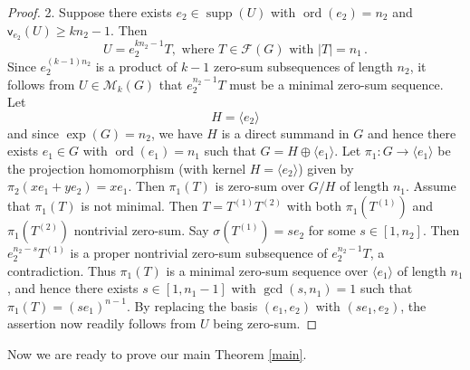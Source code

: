 \documentclass[11pt]{amsart}
\theoremstyle{definition}
\DeclareMathOperator{\ord}{ord}
\DeclareMathOperator{\supp}{supp}
\newcommand{\la}{\langle}
\newcommand{\ra}{\rangle}
\numberwithin{equation}{section}
\begin{document}
\begin{proof}
		
		
		
		
	2.	Suppose there exists $e_2\in \supp(U)$ with $\ord(e_2)=n_2$ and $\mathsf v_{e_2}(U)\ge kn_2-1$. Then 
		\[
		U=e_2^{kn_2-1}T, \text{ where } T\in \mathcal F(G) \text{ with }|T|=n_1\,.
		\]
		Since $e_2^{(k-1)n_2}$ is a product of $k-1$ zero-sum subsequences of length $n_2$, 
		it follows from $U\in \mathcal M_k(G)$ that $e_2^{n_2-1}T$ must be a minimal zero-sum sequence. Let $$H=\la e_2\ra$$ and since $\exp(G)=n_2$, we have $H$ is a direct summand in $G$ and hence there exists $e_1\in G$ with $\ord(e_1)=n_1$ such that $G=H\oplus \langle e_1\rangle$.
		Let $\pi_1:G\rightarrow \la e_1\ra$ be the projection homomorphism (with kernel $H=\la e_2\ra$) given by $\pi_2(xe_1+ye_2)=xe_1$.
		Then $\pi_1(T)$ is zero-sum over $G/H$ of length $n_1$.
		Assume that $\pi_1(T)$ is not minimal. Then $T=T^{(1)}T^{(2)}$ with both  $\pi_1(T^{(1)})$ and $\pi_1(T^{(2)})$  nontrivial zero-sum. Say $\sigma(T^{(1)})=se_2$ for some $s\in [1, n_2]$. Then $e_2^{n_2-s}T^{(1)}$ is a proper nontrivial zero-sum subsequence of $e_2^{n_2-1}T$, a contradiction. Thus $\pi_1(T)$ is a minimal zero-sum sequence over $\langle e_1\rangle$ of length $n_1$, and hence there exists $s\in [1, n_1-1]$ with $\gcd(s, n_1)=1$ such that $\pi_1(T)=(se_1)^{n-1}$. By replacing the basis $(e_1,e_2)$ with $(se_1,e_2)$, the assertion now readily follows from  $U$ being zero-sum.	
\end{proof}



\bigskip
Now we are ready to prove our main Theorem \ref{main}.
\end{document}
